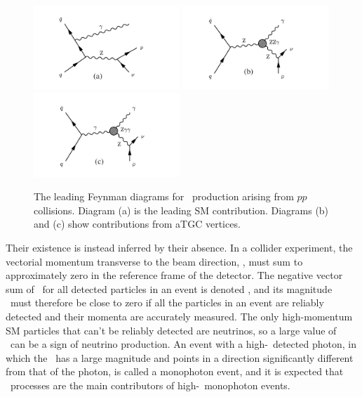 \documentclass[oneside, letterpaper, 12pt, oldfontcommands]{memoir}
\begin{document}
\begin{figure}[htb]
  \begin{center}
    \includegraphics[width=0.49\textwidth]{Figures/zg_isr_v11.pdf}
    \includegraphics[width=0.49\textwidth]{Figures/zg_zzg_v11.pdf}
    \includegraphics[width=0.49\textwidth]{Figures/zg_zgg_v11.pdf}
    \caption{
      The leading Feynman diagrams for \zinvg\ production arising from $pp$ collisions. Diagram (a) is the leading SM contribution.
      Diagrams (b) and (c) show contributions from aTGC vertices.
    }
    \label{fig:zinvg_diagrams}
  \end{center}
\end{figure}

Their existence is instead inferred by their absence.
In a collider experiment, the vectorial momentum transverse to the beam direction, \vecpT, must sum to approximately zero in the reference frame of the
detector. The negative vector sum of \vecpT\ for all detected particles in an event is denoted \vecMET, and its magnitude \MET\ must therefore be close
to zero if all the particles in an event are reliably detected and their momenta are accurately measured. The only high-momentum SM particles that can't
be reliably detected are neutrinos, so a large value of \MET\ can be a sign of neutrino production. An event with a high-\pT\ detected photon, in which
the \vecMET\ has a large magnitude and points in a direction significantly different from that of the photon, is called a monophoton event, and it is
expected that \zinvg\ processes are the main contributors of high-\pT\ monophoton events.
\end{document}
